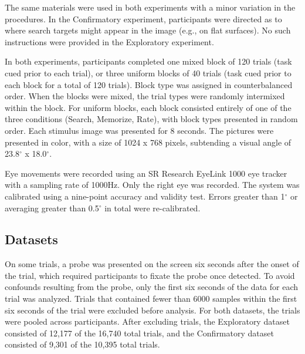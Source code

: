 \documentclass[
  english,
  man, donotrepeattitle,floatsintext]{apa6}
\begin{document}
The same materials were used in both experiments with a minor variation in the procedures. In the Confirmatory experiment, participants were directed as to where search targets might appear in the image (e.g., on flat surfaces). No such instructions were provided in the Exploratory experiment.

In both experiments, participants completed one mixed block of 120 trials (task cued prior to each trial), or three uniform blocks of 40 trials (task cued prior to each block for a total of 120 trials). Block type was assigned in counterbalanced order. When the blocks were mixed, the trial types were randomly intermixed within the block. For uniform blocks, each block consisted entirely of one of the three conditions (Search, Memorize, Rate), with block types presented in random order. Each stimulus image was presented for 8 seconds. The pictures were presented in color, with a size of 1024 x 768 pixels, subtending a visual angle of 23.8\(^{\circ}\) x 18.0\(^{\circ}\).

Eye movements were recorded using an SR Research EyeLink 1000 eye tracker with a sampling rate of 1000Hz. Only the right eye was recorded. The system was calibrated using a nine-point accuracy and validity test. Errors greater than 1\(^{\circ}\) or averaging greater than 0.5\(^{\circ}\) in total were re-calibrated.

\subsection{Datasets}

On some trials, a probe was presented on the screen six seconds after the onset of the trial, which required participants to fixate the probe once detected. To avoid confounds resulting from the probe, only the first six seconds of the data for each trial was analyzed. Trials that contained fewer than 6000 samples within the first six seconds of the trial were excluded before analysis. For both datasets, the trials were pooled across participants. After excluding trials, the Exploratory dataset consisted of 12,177 of the 16,740 total trials, and the Confirmatory dataset consisted of 9,301 of the 10,395 total trials.
\end{document}
